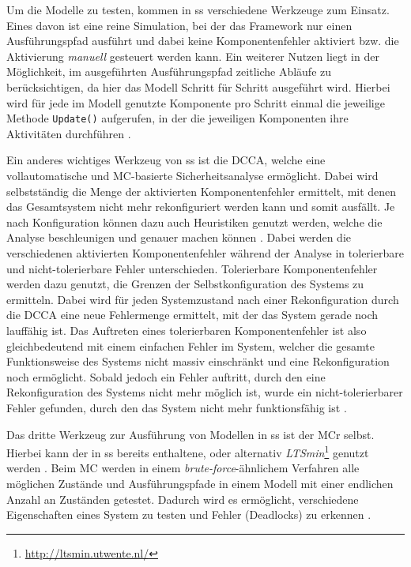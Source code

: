 Um die Modelle zu testen, kommen in \ac{ss} verschiedene Werkzeuge zum Einsatz.
Eines davon ist eine reine Simulation, bei der das Framework nur einen Ausführungspfad ausführt und dabei keine Komponentenfehler aktiviert bzw. die Aktivierung \textit{manuell} gesteuert werden kann.
Ein weiterer Nutzen liegt in der Möglichkeit, im ausgeführten Ausführungspfad zeitliche Abläufe zu berücksichtigen, da hier das Modell Schritt für Schritt ausgeführt wird.
Hierbei wird für jede im Modell genutzte Komponente pro Schritt einmal die jeweilige Methode \texttt{Update()} aufgerufen, in der die jeweiligen Komponenten ihre Aktivitäten durchführen \cite{Habermaier2016}.

Ein anderes wichtiges Werkzeug von \ac{ss} ist die \ac{DCCA}, welche eine vollautomatische und \ac{MC}-basierte Sicherheitsanalyse ermöglicht.
Dabei wird selbstständig die Menge der aktivierten Komponentenfehler ermittelt, mit denen das Gesamtsystem nicht mehr rekonfiguriert werden kann und somit ausfällt.
Je nach Konfiguration können dazu auch Heuristiken genutzt werden, welche die Analyse beschleunigen und genauer machen können \cite{Eberhardinger2016}.
Dabei werden die verschiedenen aktivierten Komponentenfehler während der Analyse in tolerierbare und nicht-tolerierbare Fehler unterschieden.
Tolerierbare Komponentenfehler werden dazu genutzt, die Grenzen der Selbstkonfiguration des Systems zu ermitteln.
Dabei wird für jeden Systemzustand nach einer Rekonfiguration durch die \ac{DCCA} eine neue Fehlermenge ermittelt, mit der das System gerade noch lauffähig ist.
Das Auftreten eines tolerierbaren Komponentenfehler ist also gleichbedeutend mit einem einfachen Fehler im System, welcher die gesamte Funktionsweise des Systems nicht massiv einschränkt und eine Rekonfiguration noch ermöglicht.
Sobald jedoch ein Fehler auftritt, durch den eine Rekonfiguration des Systems nicht mehr möglich ist, wurde ein nicht-tolerierbarer Fehler gefunden, durch den das System nicht mehr funktionsfähig ist \cite{Habermaier2015}.

Das dritte Werkzeug zur Ausführung von Modellen in \ac{ss} ist der \ac{MCr} selbst.
Hierbei kann der in \ac{ss} bereits enthaltene, oder alternativ \emph{LTSmin}\footnote{\url{http://ltsmin.utwente.nl/}} genutzt werden \cite{SSWikiModelChecking}.
Beim \ac{MC} werden in einem \emph{brute-force}-ähnlichem Verfahren alle möglichen Zustände und Ausführungspfade in einem Modell mit einer endlichen Anzahl an Zuständen getestet.
Dadurch wird es ermöglicht, verschiedene Eigenschaften eines System zu testen und Fehler (\zB Deadlocks) zu erkennen \cite{Grumberg1999}.

